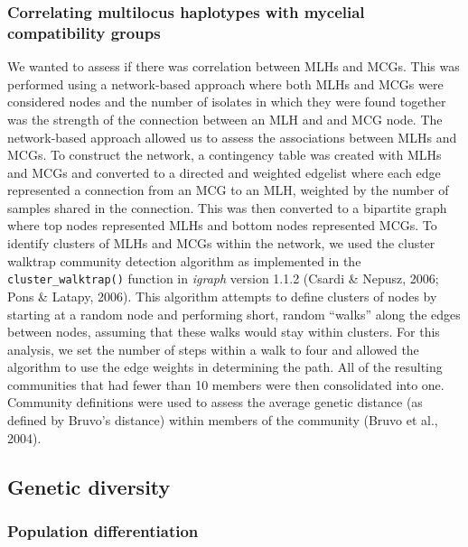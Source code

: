 \subsubsection*{Correlating multilocus haplotypes with mycelial
compatibility
groups}\label{correlating-multilocus-haplotypes-with-mycelial-compatibility-groups}

We wanted to assess if there was correlation between MLHs and MCGs. This
was performed using a network-based approach where both MLHs and MCGs
were considered nodes and the number of isolates in which they were
found together was the strength of the connection between an MLH and and
MCG node. The network-based approach allowed us to assess the
associations between MLHs and MCGs. To construct the network, a
contingency table was created with MLHs and MCGs and converted to a
directed and weighted edgelist where each edge represented a connection
from an MCG to an MLH, weighted by the number of samples shared in the
connection. This was then converted to a bipartite graph where top nodes
represented MLHs and bottom nodes represented MCGs. To identify clusters
of MLHs and MCGs within the network, we used the cluster walktrap
community detection algorithm as implemented in the
\texttt{cluster\_walktrap()} function in \emph{igraph} version 1.1.2
(Csardi \& Nepusz, 2006; Pons \& Latapy, 2006). This algorithm attempts
to define clusters of nodes by starting at a random node and performing
short, random ``walks'' along the edges between nodes, assuming that
these walks would stay within clusters. For this analysis, we set the
number of steps within a walk to four and allowed the algorithm to use
the edge weights in determining the path. All of the resulting
communities that had fewer than 10 members were then consolidated into
one. Community definitions were used to assess the average genetic
distance (as defined by Bruvo's distance) within members of the
community (Bruvo et al., 2004).

\subsection*{Genetic diversity}\label{genetic-diversity}

\subsubsection*{Population
differentiation}\label{population-differentiation}

